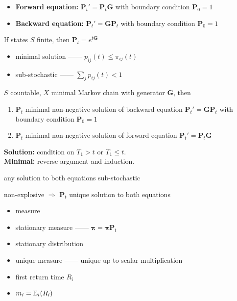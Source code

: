 \begin{itemize}
    \item \textbf{Forward equation:} $\bm P_t' = \bm P_t \bm G$ with boundary condition $\bm P_0 = 1$
    \item \textbf{Backward equation:} $\bm P_t' = \bm G \bm P_t$  with boundary condition $\bm P_0 = 1$
\end{itemize}

\begin{fact}
    If states $S$ finite, then $\bm P_t = e^{t\bm G}$
\end{fact}

\begin{itemize}
    \item minimal solution ------ $p_{ij}(t) \leq \pi_{ij}(t)$
    \item sub-stochastic ------ $\sum_j p_{ij}(t) < 1$
\end{itemize}

\begin{thm}
    $S$ countable, $X$ minimal Markov chain with generator $\bm G$, then
    \begin{enumerate}
        \item $\bm P_t$ minimal non-negative solution of backward equation $\bm P_t' = \bm G \bm P_t$  with boundary condition $\bm P_0 = 1$
        \item $\bm P_t$ minimal non-negative solution of forward equation $\bm P_t' = \bm P_t \bm G$
    \end{enumerate}
\end{thm}
\begin{pf}
    \textbf{Solution:} condition on $T_1 > t$ or $T_1 \leq t$.\\
    \textbf{Minimal:} reverse argument and induction.
\end{pf}

\begin{fact}
    any solution to both equations sub-stochastic
\end{fact}

\begin{fact}
    non-explosive $\Rightarrow$ $\bm P_t$ unique solution to both equations
\end{fact}

\begin{itemize}
    \item measure
    \item stationary measure ------ $\bm{\pi} = \bm\pi \bm P_t$
    \item stationary distribution
    \item unique measure ------ unique up to scalar multiplication
    \item first return time $R_{i}$
    \item $m_i = \mathbb{E}_i(R_i)$
\end{itemize}

